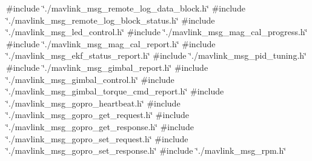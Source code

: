 {\ttfamily \#include \char`\"{}./mavlink\+\_\+msg\+\_\+remote\+\_\+log\+\_\+data\+\_\+block.\+h\char`\"{}}\newline
{\ttfamily \#include \char`\"{}./mavlink\+\_\+msg\+\_\+remote\+\_\+log\+\_\+block\+\_\+status.\+h\char`\"{}}\newline
{\ttfamily \#include \char`\"{}./mavlink\+\_\+msg\+\_\+led\+\_\+control.\+h\char`\"{}}\newline
{\ttfamily \#include \char`\"{}./mavlink\+\_\+msg\+\_\+mag\+\_\+cal\+\_\+progress.\+h\char`\"{}}\newline
{\ttfamily \#include \char`\"{}./mavlink\+\_\+msg\+\_\+mag\+\_\+cal\+\_\+report.\+h\char`\"{}}\newline
{\ttfamily \#include \char`\"{}./mavlink\+\_\+msg\+\_\+ekf\+\_\+status\+\_\+report.\+h\char`\"{}}\newline
{\ttfamily \#include \char`\"{}./mavlink\+\_\+msg\+\_\+pid\+\_\+tuning.\+h\char`\"{}}\newline
{\ttfamily \#include \char`\"{}./mavlink\+\_\+msg\+\_\+gimbal\+\_\+report.\+h\char`\"{}}\newline
{\ttfamily \#include \char`\"{}./mavlink\+\_\+msg\+\_\+gimbal\+\_\+control.\+h\char`\"{}}\newline
{\ttfamily \#include \char`\"{}./mavlink\+\_\+msg\+\_\+gimbal\+\_\+torque\+\_\+cmd\+\_\+report.\+h\char`\"{}}\newline
{\ttfamily \#include \char`\"{}./mavlink\+\_\+msg\+\_\+gopro\+\_\+heartbeat.\+h\char`\"{}}\newline
{\ttfamily \#include \char`\"{}./mavlink\+\_\+msg\+\_\+gopro\+\_\+get\+\_\+request.\+h\char`\"{}}\newline
{\ttfamily \#include \char`\"{}./mavlink\+\_\+msg\+\_\+gopro\+\_\+get\+\_\+response.\+h\char`\"{}}\newline
{\ttfamily \#include \char`\"{}./mavlink\+\_\+msg\+\_\+gopro\+\_\+set\+\_\+request.\+h\char`\"{}}\newline
{\ttfamily \#include \char`\"{}./mavlink\+\_\+msg\+\_\+gopro\+\_\+set\+\_\+response.\+h\char`\"{}}\newline
{\ttfamily \#include \char`\"{}./mavlink\+\_\+msg\+\_\+rpm.\+h\char`\"{}}\newline
